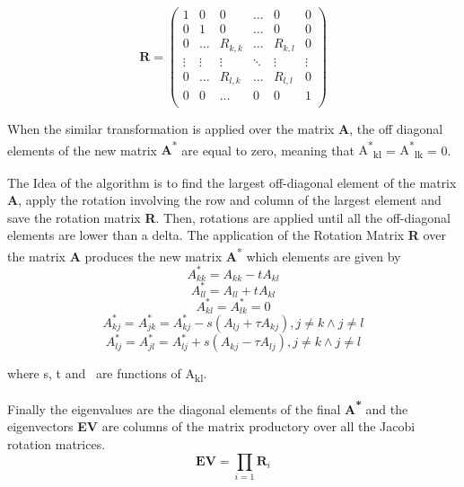\documentclass{tmr}
\begin{document}
\[
 \mathbf{R} =
\begin{pmatrix}
1 & 0 & 0 & \hdots & 0 & 0 \\
0 & 1 & 0 & \hdots & 0 & 0 \\
0 & \hdots & R_{k,k} & \hdots & R_{k,l} &  0 \\ 
\vdots & \vdots & \vdots & \ddots & \vdots & \vdots \\
0 &  \hdots & R_{l,k} & \hdots & R_{l,l} & 0 \\
0 & 0 & \hdots & 0 & 0 & 1 \\ 
\end{pmatrix}
\]

 When the similar transformation is applied over the matrix
{\textbf A}, the off diagonal elements of the new matrix {\textbf A\textsuperscript{*}} are equal
to zero, meaning that 
{A\textsuperscript{*}\textsubscript{kl}} = {A\textsuperscript{*}\textsubscript{lk}} = 0.
\par The Idea of the algorithm is to find the largest off-diagonal element of the matrix \textbf{A},
 apply the rotation involving the row and column of the largest element and save the rotation matrix \textbf{R}. 
Then, rotations are applied until all the off-diagonal elements are lower than a delta.
The application of the Rotation Matrix \textbf{R} over the matrix \textbf{A} produces
the new matrix {\textbf A\textsuperscript{*}} which elements are given by
\begin{equation}\label{1} A^{*}_{kk} = A_{kk}  -  t A_{kl} \end{equation}
\begin{equation}\label{2} A^{*}_{ll} = A_{ll} +   t A_{kl} \end{equation}
\begin{equation}\label{3} A^{*}_{kl} =A^{*}_{lk} = 0       \end{equation}
\begin{equation}\label{4}
A^{*}_{kj} =A^{*}_{jk} = A^{*}_{kj} - s (A_{lj} + \tau A_{kj}), j \not = k \wedge j \not = l 
\end{equation}
\begin{equation}\label{5}
A^{*}_{lj} =A^{*}_{jl} = A^{*}_{lj} + s (A_{kj} - \tau A_{lj}), j \not = k \wedge j \not = l 
\end{equation}

where s, t and \texttau\ are functions of A\textsubscript{kl}.

\par Finally the eigenvalues are the diagonal elements of the final \textbf{A\textsuperscript{*}}
 and the eigenvectors {\bf EV} 
are columns of the matrix productory over all the Jacobi rotation matrices.
\[ \mathbf{EV} = \prod_{i=1} \mathbf{R}_i \]
\end{document}
